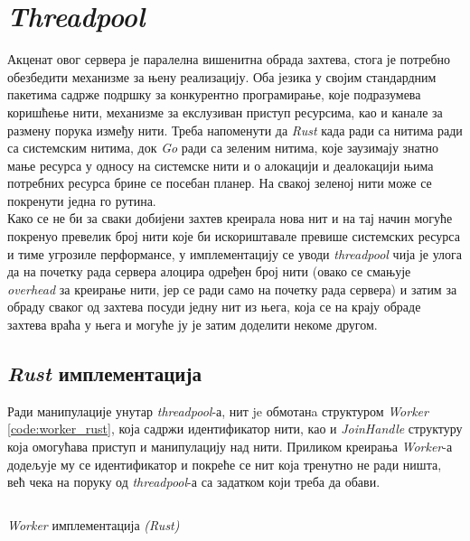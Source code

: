 \section{\textit{Threadpool}}

Акценат овог сервера је паралелна вишенитна обрада захтева, стога је потребно обезбедити механизме за њену реализацију. Оба језика у својим стандардним пакетима садрже подршку за конкурентно програмирање, које подразумева коришћење нити, механизме за екслузиван приступ ресурсима, као и канале за размену порука између нити. Треба напоменути да \textit{Rust} када ради са нитима ради са системским нитима, док \textit{Go} ради са зеленим нитима, које заузимају знатно мање ресурса у односу на системске нити и о алокацији и деалокацији њима потребних ресурса брине се посебан планер. На свакој зеленој нити може се покренути једна го рутина.\\

Како се не би за сваки добијени захтев креирала нова нит и на тај начин могуће покренуо превелик број нити које би искориштавале превише системских ресурса и тиме угрозиле перформансе, у имплементацију се уводи \textit{threadpool} чија је улога да на почетку рада сервера алоцира одређен број нити (овако се смањује \textit{overhead} за креирање нити, јер се ради само на почетку рада сервера) и затим за обраду сваког од захтева посуди једну нит из њега, која се на крају обраде захтева враћа у њега и могуће ју је затим доделити некоме другом. 

\subsection{\textit{Rust} имплементација}

Ради манипулације унутар \textit{threadpool}-а, нит je обмотанa структуром  \textit{Worker} \ref{code:worker_rust}, која садржи идентификатор нити, као и \textit{JoinHandle} структуру која омогућава приступ и манипулацију над нити. Приликом креирања \textit{Worker}-а додељује му се идентификатор и покреће се нит која тренутно не ради ништа, већ чека на поруку од \textit{threadpool}-а са задатком који треба да обави. \\

\begin{listing}[H]
\inputminted{rust}{kodovi/worker.rs}
\caption{\textit{Worker} имплементација \textit{(Rust)}}
\label{code:worker_rust}
\end{listing}


